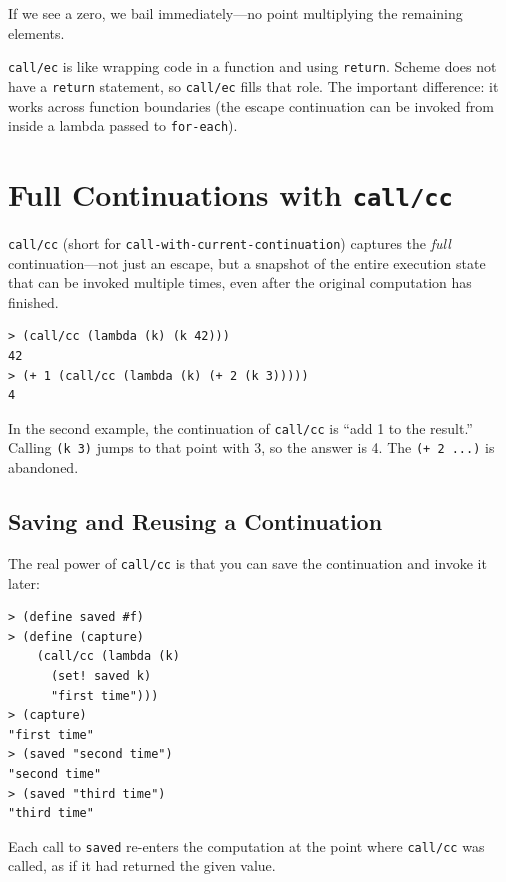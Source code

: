 If we see a zero, we bail immediately---no point multiplying the remaining elements.

\begin{note}
\texttt{call/ec} is like wrapping code in a function and using \texttt{return}. Scheme does not have a \texttt{return} statement, so \texttt{call/ec} fills that role. The important difference: it works across function boundaries (the escape continuation can be invoked from inside a lambda passed to \texttt{for-each}).
\end{note}

\section{Full Continuations with \texttt{call/cc}}

\texttt{call/cc} (short for \texttt{call-with-current-continuation}) captures the \emph{full} continuation---not just an escape, but a snapshot of the entire execution state that can be invoked multiple times, even after the original computation has finished.

\begin{lstlisting}[style=repl]
> (call/cc (lambda (k) (k 42)))
42
> (+ 1 (call/cc (lambda (k) (+ 2 (k 3)))))
4
\end{lstlisting}

In the second example, the continuation of \texttt{call/cc} is ``add 1 to the result.'' Calling \texttt{(k 3)} jumps to that point with 3, so the answer is 4. The \texttt{(+ 2 ...)} is abandoned.

\subsection{Saving and Reusing a Continuation}

The real power of \texttt{call/cc} is that you can save the continuation and invoke it later:

\begin{lstlisting}[style=repl]
> (define saved #f)
> (define (capture)
    (call/cc (lambda (k)
      (set! saved k)
      "first time")))
> (capture)
"first time"
> (saved "second time")
"second time"
> (saved "third time")
"third time"
\end{lstlisting}

Each call to \texttt{saved} re-enters the computation at the point where \texttt{call/cc} was called, as if it had returned the given value.

